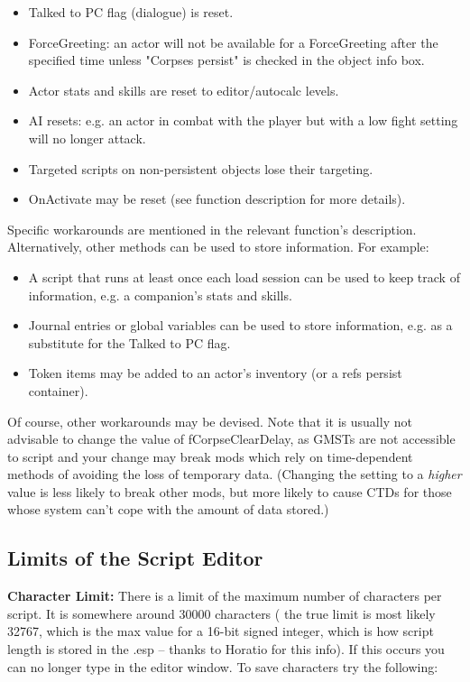 \begin{itemize}
\item
  Talked to PC flag (dialogue) is reset.
\item
  ForceGreeting: an actor will not be available for a ForceGreeting
  after the specified time unless "Corpses persist" is checked in the
  object info box.
\item
  Actor stats and skills are reset to editor/autocalc levels.
\item
  AI resets: e.g. an actor in combat with the player but with a low
  fight setting will no longer attack.
\item
  Targeted scripts on non-persistent objects lose their targeting.
\item
  OnActivate may be reset (see function description for more details).
\end{itemize}

Specific workarounds are mentioned in the relevant function's
description. Alternatively, other methods can be used to store
information. For example:

\begin{itemize}
\item
  A script that runs at least once each load session can be used to keep
  track of information, e.g. a companion's stats and skills.
\item
  Journal entries or global variables can be used to store information,
  e.g. as a substitute for the Talked to PC flag.
\item
  Token items may be added to an actor's inventory (or a refs persist
  container).
\end{itemize}

Of course, other workarounds may be devised. Note that it is usually not
advisable to change the value of fCorpseClearDelay, as GMSTs are not
accessible to script and your change may break mods which rely on
time-dependent methods of avoiding the loss of temporary data. (Changing
the setting to a \emph{higher} value is less likely to break other mods,
but more likely to cause CTDs for those whose system can't cope with the
amount of data stored.)

\hypertarget{limits-of-the-script-editor}{%
\subsection{Limits of the Script
Editor}\label{limits-of-the-script-editor}}

\textbf{Character Limit:} There is a limit of the maximum number of
characters per script. It is somewhere around 30000 characters ( the
true limit is most likely 32767, which is the max value for a 16-bit
signed integer, which is how script length is stored in the .esp --
thanks to Horatio for this info). If this occurs you can no longer type
in the editor window. To save characters try the following:


